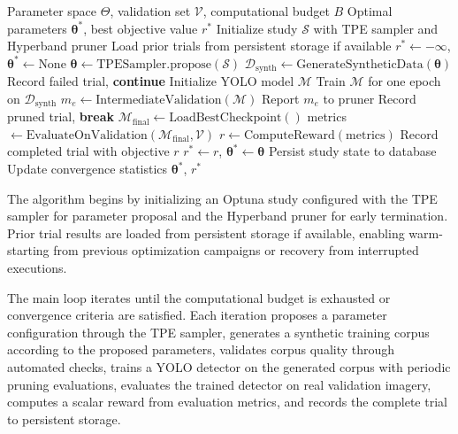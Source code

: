 \begin{algorithm}[htbp]
\caption{Main Synthetic Data Optimization Loop}
\label{alg:main_optimization}
\begin{algorithmic}[1]
\Require Parameter space $\Theta$, validation set $\mathcal{V}$, computational budget $B$
\Ensure Optimal parameters $\boldsymbol{\theta}^*$, best objective value $r^*$
\State Initialize study $\mathcal{S}$ with TPE sampler and Hyperband pruner
\State Load prior trials from persistent storage if available
\State $r^* \gets -\infty$, $\boldsymbol{\theta}^* \gets \text{None}$
    \State $\boldsymbol{\theta} \gets \text{TPESampler.propose}(\mathcal{S})$ 
    \State $\mathcal{D}_{\text{synth}} \gets \text{GenerateSyntheticData}(\boldsymbol{\theta})$ 
        \State Record failed trial, \textbf{continue}
    \EndIf
    \State Initialize YOLO model $\mathcal{M}$
        \State Train $\mathcal{M}$ for one epoch on $\mathcal{D}_{\text{synth}}$
        \State $m_e \gets \text{IntermediateValidation}(\mathcal{M})$
        \State Report $m_e$ to pruner
            \State Record pruned trial, \textbf{break}
        \EndIf
    \EndFor
        \State $\mathcal{M}_{\text{final}} \gets \text{LoadBestCheckpoint}()$
        \State metrics $\gets \text{EvaluateOnValidation}(\mathcal{M}_{\text{final}}, \mathcal{V})$
        \State $r \gets \text{ComputeReward}(\text{metrics})$
        \State Record completed trial with objective $r$
            \State $r^* \gets r$, $\boldsymbol{\theta}^* \gets \boldsymbol{\theta}$
        \EndIf
    \EndIf
    \State Persist study state to database
    \State Update convergence statistics
\EndWhile
\State \Return $\boldsymbol{\theta}^*$, $r^*$
\end{algorithmic}
\end{algorithm}

The algorithm begins by initializing an Optuna study configured with the TPE sampler for parameter proposal and the Hyperband pruner for early termination. Prior trial results are loaded from persistent storage if available, enabling warm-starting from previous optimization campaigns or recovery from interrupted executions.

The main loop iterates until the computational budget is exhausted or convergence criteria are satisfied. Each iteration proposes a parameter configuration through the TPE sampler, generates a synthetic training corpus according to the proposed parameters, validates corpus quality through automated checks, trains a YOLO detector on the generated corpus with periodic pruning evaluations, evaluates the trained detector on real validation imagery, computes a scalar reward from evaluation metrics, and records the complete trial to persistent storage.

